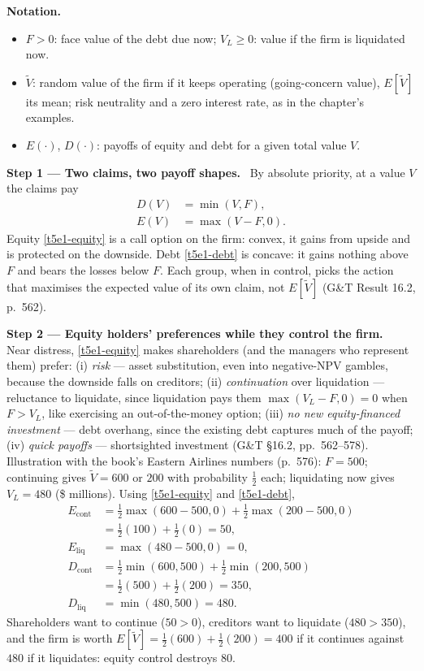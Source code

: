 \documentclass[11pt,a4paper]{article}
\newcommand{\notation}{\par\noindent\textbf{Notation.}}
\newcommand{\step}[2]{\par\medskip\noindent\textbf{Step #1 --- #2.}~}
\begin{document}
\notation
\begin{itemize}
  \item $F>0$: face value of the debt due now; $V_L\geq 0$: value if the firm is liquidated now.
  \item $\tilde V$: random value of the firm if it keeps operating (going-concern value), $E[\tilde V]$ its mean; risk neutrality and a zero interest rate, as in the chapter's examples.
  \item $E(\cdot)$, $D(\cdot)$: payoffs of equity and debt for a given total value $V$.
\end{itemize}

\step{1}{Two claims, two payoff shapes} By absolute priority, at a value $V$ the claims pay
\begin{align}
  D(V) &= \min(V,F), \label{t5e1-debt}\\
  E(V) &= \max(V-F,0). \label{t5e1-equity}
\end{align}
Equity \eqref{t5e1-equity} is a call option on the firm: convex, it gains from upside and is
protected on the downside. Debt \eqref{t5e1-debt} is concave: it gains nothing above $F$ and bears the
losses below $F$. Each group, when in control, picks the action that maximises the expected value
of its own claim, not $E[\tilde V]$ (G\&T Result 16.2, p.~562).

\step{2}{Equity holders' preferences while they control the firm} Near distress, \eqref{t5e1-equity}
makes shareholders (and the managers who represent them) prefer:
(i) \emph{risk} --- asset substitution, even into negative-NPV gambles, because the downside falls on
creditors; (ii) \emph{continuation} over liquidation --- reluctance to liquidate, since liquidation
pays them $\max(V_L-F,0)=0$ when $F>V_L$, like exercising an out-of-the-money option;
(iii) \emph{no new equity-financed investment} --- debt overhang, since the existing debt captures
much of the payoff; (iv) \emph{quick payoffs} --- shortsighted investment (G\&T \S 16.2, pp.~562--578).
Illustration with the book's Eastern Airlines numbers (p.~576): $F=500$; continuing gives
$\tilde V=600$ or $200$ with probability $\tfrac12$ each; liquidating now gives $V_L=480$ (\$ millions).
Using \eqref{t5e1-equity} and \eqref{t5e1-debt},
\begin{align}
  E_{\text{cont}} &= \tfrac12\max(600-500,0)+\tfrac12\max(200-500,0) \label{t5e1-Econt}\\
                  &= \tfrac12(100)+\tfrac12(0) = 50, \nonumber\\
  E_{\text{liq}}  &= \max(480-500,0) = 0, \label{t5e1-Eliq}\\
  D_{\text{cont}} &= \tfrac12\min(600,500)+\tfrac12\min(200,500) \label{t5e1-Dcont}\\
                  &= \tfrac12(500)+\tfrac12(200) = 350, \nonumber\\
  D_{\text{liq}}  &= \min(480,500) = 480. \label{t5e1-Dliq}
\end{align}
Shareholders want to continue ($50>0$), creditors want to liquidate ($480>350$), and the firm is
worth $E[\tilde V]=\tfrac12(600)+\tfrac12(200)=400$ if it continues against $480$ if it liquidates:
equity control destroys 80.
\end{document}
